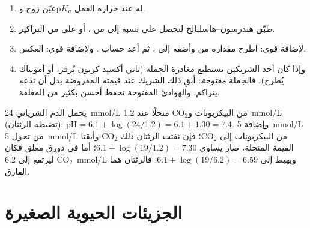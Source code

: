 \begin{method}\label{met:b1:water-small-molecules:bufferarith}
\begin{enumerate}
  \item عيّن زوج   وp$K_a$ له عند حرارة العمل.
  \item طبّق هندرسون--هاسلبالخ لتحصل على نسبة  إلى  من
        ، أو على  من التراكيز.
  \item لإضافة  قوي: اطرح مقداره من  وأضفه إلى ، ثم أعد
        حساب . ولإضافة  قوي: العكس.
  \item وإذا كان أحد الشريكين يستطيع مغادرة الجملة (ثاني أكسيد كربون
        يُزفر، أو أمونياك يُطرح)، فالجملة \emph{مفتوحة}: أبقِ ذلك
        الشريك عند قيمته المفروضة بدل أن تدعه يتراكم. والهوادئ
        المفتوحة تحفظ  أحسن بكثير من المغلقة.
\end{enumerate}
\end{method}

\begin{example}[الدم]\label{ex:b1:water-small-molecules:blood}
يحمل الدم الشرياني \qty{24}{mmol/L} من البيكربونات و$\mathrm{CO_2}$
منحلًا عند \qty{1.2}{mmol/L} (تضبطه الرئتان):
$\mathrm{pH} =
6.1 + \log(24/1.2) = 6.1 + 1.30 = 7.4$. وإضافة
\qty{5}{mmol/L} من  تحول \qty{5}{mmol/L} من البيكربونات إلى
$\mathrm{CO_2}$؛ فإن نفثت الرئتان ذلك $\mathrm{CO_2}$ وأبقتا القيمة
المنحلة، صار  يساوي $6.1 + \log(19/1.2) = 7.30$؛ أما في دورق مغلق
فكان $\mathrm{CO_2}$ ليرتفع إلى \qty{6.2}{mmol/L} ويهبط  إلى
$6.1 + \log(19/6.2) =
6.59$. فالرئتان هما الفارق.
\end{example}

\section{الجزيئات الحيوية الصغيرة}

